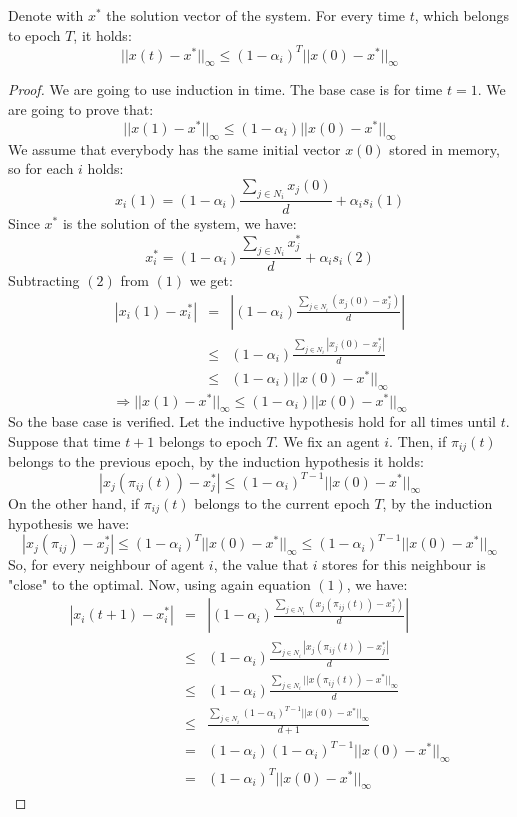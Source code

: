 \begin{lemma}
Denote with $x^*$ the solution vector of the system. For every time $t$, which belongs to epoch $T$, it holds:
$$ ||x(t)-x^*||_{\infty} \leq \left( 1-\alpha_i\right)^T||x(0)-x^*||_{\infty}$$
\end{lemma}

\begin{proof}
We are going to use induction in time. The base case is for time $t=1$. We are going to prove that: $$ ||x(1)-x^*||_{\infty} \leq (1-\alpha_i)||x(0)-x^*||_{\infty}$$
We assume that everybody has the same initial vector $x(0)$ stored in memory, so for each $i$ holds:
$$x_i(1) = (1-\alpha_i)\frac{\sum_{j \in N_i}x_j(0)}{d}+\alpha_i s_i (1)$$Since $x^*$ is the solution of the system, we have:
$$ x_i^* = (1-\alpha_i)\frac{\sum_{j \in N_i}x_j^*}{d}+\alpha_i s_i (2)$$
Subtracting $(2)$ from $(1)$ we get:
\begin{eqnarray*}
|x_i(1) - x_i^*| &=& |(1-\alpha_i)\frac{\sum_{j \in N_i}(x_j(0)-x_j^*)}{d}|\\
&\leq& (1-\alpha_i)\frac{\sum_{j \in N_i}|x_j(0)-x_j^*|}{d} \\
&\leq& (1-\alpha_i) ||x(0)-x^*||_{\infty}
\end{eqnarray*}
$$ \Rightarrow ||x(1)-x^*||_{\infty} \leq (1-\alpha_i)||x(0)-x^*||_{\infty}$$
So the base case is verified. Let the inductive hypothesis hold for all times until $t$. Suppose that time $t+1$ belongs to epoch $T$. We fix an agent $i$. Then, if $\pi_{ij}(t)$ belongs to the previous epoch, by the induction hypothesis it holds:
$$ |x_j(\pi_{ij}(t)) - x_j^*| \leq \left( 1-\alpha_i\right)^{T-1}||x(0)-x^*||_{\infty}$$
 On the other hand, if $\pi_{ij}(t)$ belongs to the current epoch $T$, by the induction hypothesis we have:
 $$ |x_j(\pi_{ij}) - x_j^*| \leq \left( 1-\alpha_i\right)^{T}||x(0)-x^*||_{\infty} \leq \left( 1-\alpha_i\right)^{T-1}||x(0)-x^*||_{\infty}$$
 So, for every neighbour of agent $i$, the value that $i$ stores for this neighbour is "close" to the optimal. Now, using again equation $(1)$, we have:
 \begin{eqnarray*}
|x_i(t+1) - x_i^*| &=& |(1-\alpha_i)\frac{\sum_{j \in N_i}(x_j(\pi_{ij}(t))-x_j^*)}{d}|\\
&\leq& (1-\alpha_i)\frac{\sum_{j \in N_i}|x_j(\pi_{ij}(t))-x_j^*|}{d}\\
&\leq& (1-\alpha_i)\frac{\sum_{j \in N_i}||x(\pi_{ij}(t))-x^*||_\infty}{d}\\
&\leq& \frac{\sum_{j \in N_i}\left(1-\alpha_i\right)^{T-1}||x(0)-x^*||_{\infty}}{d+1}\\
&=& (1-\alpha_i)\left(1-\alpha_i\right)^{T-1}||x(0)-x^*||_{\infty}\\
&=& \left(1-\alpha_i\right)^{T}||x(0)-x^*||_{\infty}
 \end{eqnarray*}

\end{proof}

